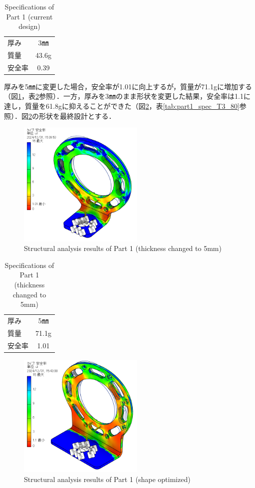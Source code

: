 \begin{table}[h]
  \centering
  \caption{Specifications of Part 1 (current design)}
  \begin{tabular}{lc}
    \hline
    厚み & 3㎜ \\ 
    質量 & 43.6g \\ 
    安全率 & 0.39 \\ \hline
  \end{tabular}
  \label{tab:part1_spec}
\end{table}
\clearpage
厚みを5㎜に変更した場合，安全率が1.01に向上するが，質量が71.1gに増加する（図\ref{fig:T5}，表\ref{tab:part1_spec_T5}参照）．一方，厚みを3㎜のまま形状を変更した結果，安全率は1.1に達し，質量を61.8gに抑えることができた（図\ref{fig:T3_80}，表\ref{tab:part1_spec_T3_80}参照）．図\ref{fig:T3_80}の形状を最終設計とする．

\begin{figure}[h]
  \centering
  \includegraphics[width=6cm]{images/design/T5.png}
  \caption{Structural analysis results of Part 1 (thickness changed to 5mm)}
  \label{fig:T5}
\end{figure}

\begin{table}[h]
  \centering
  \caption{Specifications of Part 1 (thickness changed to 5mm)}
  \begin{tabular}{lc}
    \hline
    厚み & 5㎜ \\ 
    質量 & 71.1g \\ 
    安全率 & 1.01 \\ \hline
  \end{tabular}
  \label{tab:part1_spec_T5}
\end{table}
\clearpage

\begin{figure}[h]
  \centering
  \includegraphics[width=6cm]{images/design/T3_80.png}
  \caption{Structural analysis results of Part 1 (shape optimized)}
  \label{fig:T3_80}
\end{figure}

